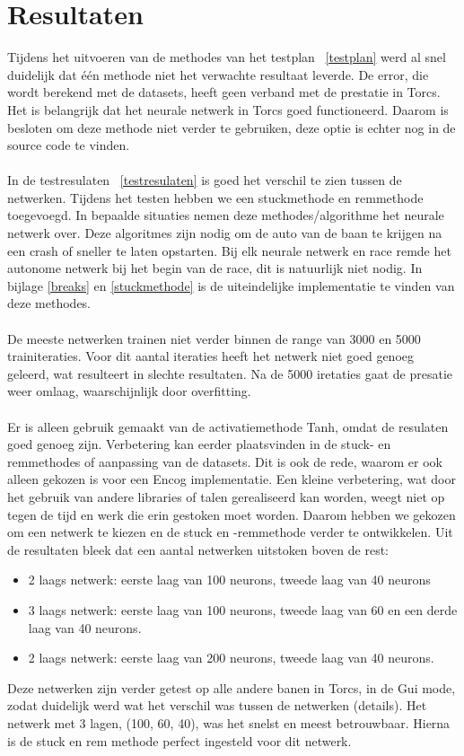 \documentclass{article}
\begin{document}
\section{Resultaten}
Tijdens het uitvoeren van de methodes van het testplan ~\ref{testplan} werd al snel duidelijk dat \'e\'en methode niet het verwachte resultaat leverde. De error, die wordt berekend met de datasets, heeft geen verband met de prestatie in Torcs. Het is belangrijk dat het neurale netwerk in Torcs goed functioneerd. Daarom is besloten om deze methode niet verder te gebruiken, deze optie is echter nog in de source code te vinden.  \\\\
In de testresulaten ~\ref{testresulaten} is goed het verschil te zien tussen de netwerken. Tijdens het testen hebben we een stuckmethode en remmethode toegevoegd. In bepaalde situaties nemen deze methodes/algorithme het neurale netwerk over. Deze algoritmes zijn nodig om de auto van de baan te krijgen na een crash of sneller te laten opstarten. Bij elk neurale netwerk en race remde het autonome netwerk bij het begin van de race, dit is natuurlijk niet nodig. In bijlage \ref{breaks} en \ref{stuckmethode} is de uiteindelijke implementatie te vinden van deze methodes. \\\\
De meeste netwerken trainen niet verder binnen de range van 3000 en 5000 trainiteraties. Voor dit aantal iteraties heeft het netwerk niet goed genoeg geleerd, wat resulteert in slechte resultaten. Na de 5000 iretaties gaat de presatie weer omlaag, waarschijnlijk door overfitting. \\\\
Er is alleen gebruik gemaakt van de activatiemethode Tanh, omdat de resulaten goed genoeg zijn. Verbetering kan eerder plaatsvinden in de stuck- en remmethodes of aanpassing van de datasets. Dit is ook de rede, waarom er ook alleen gekozen is voor een Encog implementatie. Een kleine verbetering, wat door het gebruik van andere libraries of talen gerealiseerd kan worden, weegt niet op tegen de tijd en werk die erin gestoken moet worden. Daarom hebben we gekozen om een netwerk te kiezen en de stuck en -remmethode verder te ontwikkelen. Uit de resultaten bleek dat een aantal netwerken uitstoken boven de rest:
\begin{itemize}
\item 2 laags netwerk: eerste laag van 100 neurons, tweede laag van 40 neurons
\item 3 laags netwerk: eerste laag van 100 neurons, tweede laag van 60 en een derde laag van 40 neurons.
\item 2 laags netwerk: eerste laag van 200 neurons, tweede laag van 40 neurons. 
\end{itemize}
Deze netwerken zijn verder getest op alle andere banen in Torcs, in de Gui mode, zodat duidelijk werd wat het verschil was tussen de netwerken (details). Het netwerk met 3 lagen, (100, 60, 40), was het snelst en meest betrouwbaar. Hierna is de stuck en rem methode perfect ingesteld voor dit netwerk.
 \pagebreak
\end{document}
